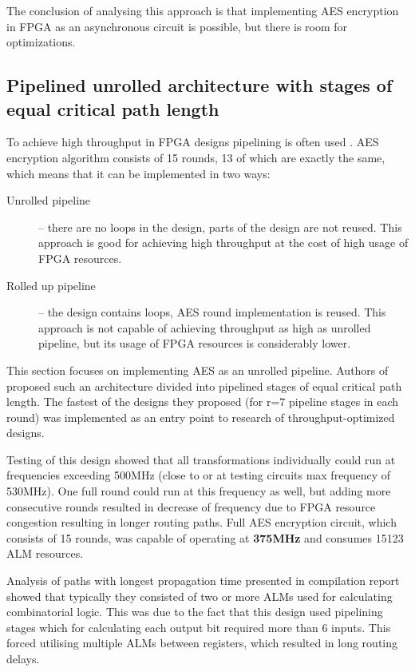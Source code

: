 The conclusion of analysing this approach is that implementing AES encryption in FPGA as an asynchronous circuit is possible, but there is room for optimizations.


\subsection{Pipelined unrolled architecture with stages of equal critical path length}
To achieve high throughput in FPGA designs pipelining is often used \cite[Chapter 1]{kilts2007advanced}. AES encryption algorithm consists of 15 rounds, 13 of which are exactly the same, which means that it can be implemented in two ways:
\begin{description}
\item[Unrolled pipeline] -- there are no loops in the design, parts of the design are not reused. This approach is good for achieving high throughput at the cost of high usage of FPGA resources.
\item[Rolled up pipeline] -- the design contains loops, AES round implementation is reused. This approach is not capable of achieving throughput as high as unrolled pipeline, but its usage of FPGA resources is considerably lower.
\end{description}

This section focuses on implementing AES as an unrolled pipeline. Authors of \cite{vlsi} proposed such an architecture divided into pipelined stages of equal critical path length. The fastest of the designs they proposed \cite[Fig. 11]{vlsi} (for r=7 pipeline stages in each round) was implemented as an entry point to research of throughput-optimized designs.

Testing of this design showed that all transformations individually could run at frequencies exceeding 500MHz (close to or at testing circuits max frequency of 530MHz). One full round could run at this frequency as well, but adding more consecutive rounds resulted in decrease of frequency due to FPGA resource congestion resulting in longer routing paths. Full AES encryption circuit, which consists of 15 rounds, was capable of operating at \textbf{375MHz} and consumes 15123 ALM resources.

Analysis of paths with longest propagation time presented in compilation report showed that typically they consisted of two or more ALMs used for calculating combinatorial logic. This was due to the fact that this design used pipelining stages which for calculating each output bit required more than 6 inputs. This forced utilising multiple ALMs between registers, which resulted in long routing delays.

